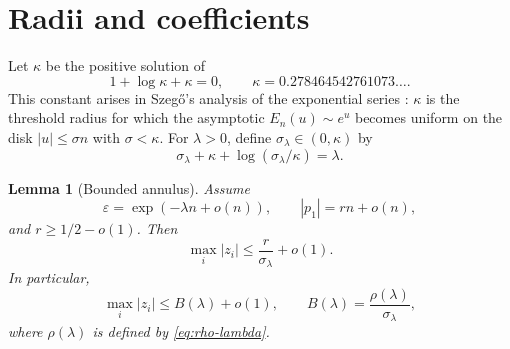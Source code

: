 \documentclass[11pt]{article}
\newtheorem{lemma}[theorem]{Lemma}
\newcommand{\eps}{\varepsilon}
\begin{document}
\section{Radii and coefficients}

Let $\kappa$ be the positive solution of
\[
        1+\log\kappa+\kappa=0,
        \qquad
        \kappa=0.278464542761073\ldots .
\]
This constant arises in Szeg\H{o}'s analysis of the exponential
series \cite{Szego}: $\kappa$ is the threshold radius for which the
asymptotic $E_n(u)\sim e^u$ becomes uniform on the disk $|u|\leq\sigma n$
with $\sigma<\kappa$.
For $\lambda>0$, define $\sigma_\lambda\in(0,\kappa)$ by
\[
        \sigma_\lambda+\kappa+
        \log(\sigma_\lambda/\kappa)=\lambda.
        \tag{4.1}\label{eq:sigma}
\]

\begin{lemma}[Bounded annulus]\label{lem:annulus}
Assume
\[
        \eps=\exp(-\lambda n+o(n)),
        \qquad |p_1|=rn+o(n),
\]
and \(r\geq1/2-o(1)\). Then
\[
        \max_i |z_i|\leq \frac r{\sigma_\lambda}+o(1).
        \tag{4.2}\label{eq:radius-r}
\]
In particular,
\[
        \max_i |z_i|\leq B(\lambda)+o(1),
        \qquad
        B(\lambda)=\frac{\rho(\lambda)}{\sigma_\lambda},
        \tag{4.3}\label{eq:B-lambda}
\]
where $\rho(\lambda)$ is defined by \eqref{eq:rho-lambda}.
\end{lemma}
\end{document}
